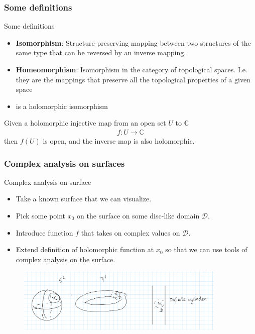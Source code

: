\documentclass{beamer}[10]
\begin{document}
\begin{frame}
	\frametitle{Some definitions}
	\begin{block}{Some definitions}
	\begin{itemize}
		\item \textbf{Isomorphism}: Structure-preserving mapping between two structures of the same type that can be reversed by an inverse mapping.
		\item \textbf{Homeomorphism}: Isomorphism in the category of topological spaces. I.e. they are the mappings that preserve all the topological properties of a given space
		\item  {} is a holomorphic isomorphism
	\end{itemize}
Given a holomorphic injective map from an open set $U$ to $\mathds{C}$
\begin{equation}
	\begin{aligned}
		f:U \to \mathds{C}
	\end{aligned}
\end{equation}
then $f(U)$ is open, and the inverse map is also holomorphic.
	\end{block}
\end{frame}

\begin{frame}
	\frametitle{Complex analysis on surfaces}
	\begin{block}{Complex analysis on surface}
		\begin{itemize}
			\item Take a known surface that we can visualize.
			\item Pick some point $x_0$ on the surface on some disc-like domain $\mathcal{D}$.
			\item Introduce function $f$ that takes on complex values on $\mathcal{D}$.
			\item Extend definition of holomorphic function at $x_0$ so that we can use tools of complex analysis on the surface.
		\end{itemize}
	\end{block}
\begin{figure}
	\includegraphics[width=10cm]{2.PNG}
\end{figure}
\end{frame}
\end{document}
